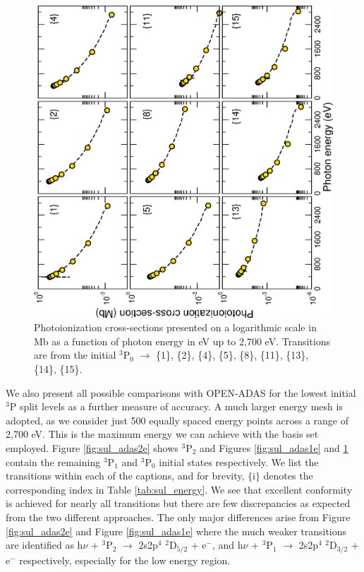 %
\begin{figure}[hbt]
\centering
\includegraphics[scale=0.665, angle=-90]{Figures/Sulphur/open-adas/comparison3_new.eps}
\caption{Photoionization cross-sections presented on a logarithmic scale in Mb as a function of photon energy in eV up to 2,700 eV. Transitions are from the initial $^3$P$_0$ $\longrightarrow$ \{1\}, \{2\}, \{4\}, \{5\}, \{8\}, \{11\}, \{13\}, \{14\}, \{15\}. \label{fig:sul_adas0e}}
\end{figure}
%

We also present all possible comparisons with OPEN-ADAS for the lowest initial $^3$P split levels as a further measure of accuracy. A much larger energy mesh is adopted, as we consider just 500 equally spaced energy points across a range of 2,700 eV. This is the maximum energy we can achieve with the basis set employed. Figure \ref{fig:sul_adas2e} shows $^3$P$_2$ and Figures \ref{fig:sul_adas1e} and \ref{fig:sul_adas0e} contain the remaining $^3$P$_1$ and $^3$P$_0$ initial states respectively. We list the transitions within each of the captions, and for brevity, $\{$i$\}$ denotes the corresponding index in Table \ref{tab:sul_energy}. We see that excellent conformity is achieved for nearly all transitions but there are few discrepancies as expected from the two different approaches. The only major differences arise from Figure \ref{fig:sul_adas2e} and Figure \ref{fig:sul_adas1e} where the much weaker transitions are identified as h$\nu$ + $^3$P$_2$ $\rightarrow$ 2s2p$^4$ $^2$D$_{5/2}$ + e$^-$, and h$\nu$ + $^3$P$_1$ $\rightarrow$ 2s2p$^4$ $^2$D$_{3/2}$ + e$^-$ respectively, especially for the low energy region. 


